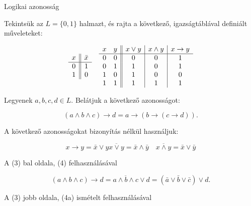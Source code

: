 \documentclass{article}
\begin{document}
Logikai azonosság

Tekintsük az $L = \lbrace0, 1\rbrace$ halmazt, és rajta a következő, igazságtáblával definiált műveleteket:

\[\begin{array}{c || c}
x & \bar{x} \\ \hline
0 & 1 \\
1 & 0 \\
\end{array}
\quad
\begin{array}{c c || c | c | c}
x & y & x \vee y & x \wedge y & x \rightarrow y \\ \hline
0 & 0 & 0 & 0 & 1 \\
0 & 1 & 1 & 0 & 1 \\
1 & 0 & 1 & 0 & 0 \\
1 & 1 & 1 & 1 & 1 \\
\end{array}
\]

Legyenek $a, b, c, d \in L$. Belátjuk a következő azonosságot:

\begin{equation}
(a \wedge b \wedge c) \rightarrow d = a \rightarrow ( b \rightarrow( c \rightarrow d))\text{.}
\end{equation}

A következő azonosságokat bizonyítás nélkül használjuk:

\begin{subequations}
\begin{equation}
x \rightarrow y = \bar{x} \vee y
\end{equation}
\begin{equation}
\overline{x \vee y} = \bar{x} \wedge \bar{y}
\quad
\overline{x \wedge y} = \bar{x} \vee \bar{y}
\end{equation}
\end{subequations}

A (3) bal oldala, (4) felhasználásával

\begin{equation}
(a \wedge b \wedge c) \rightarrow d = \overline{a \wedge b \wedge c} \vee d = (\bar{a} \vee \bar{b} \vee \bar{c}) \vee d \text{.}
\end{equation}

A (3) jobb oldala, (4a) ismételt felhasználásával
\end{document}
